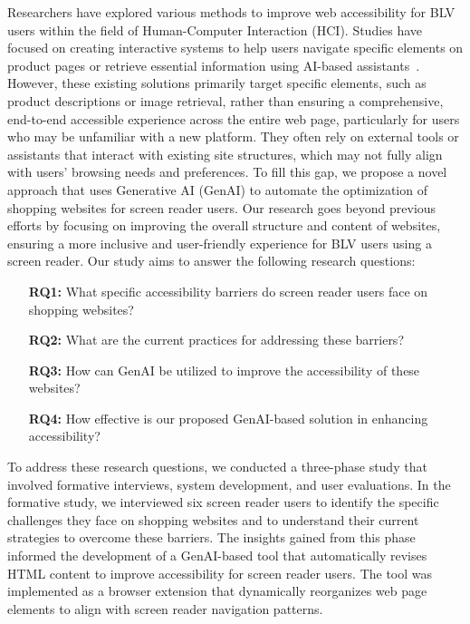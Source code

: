 Researchers have explored various methods to improve web accessibility for BLV users within the field of Human-Computer Interaction (HCI). Studies have focused on creating interactive systems to help users navigate specific elements on product pages or retrieve essential information using AI-based assistants~\cite{10.1145/3411764.3445547, 10.1145/3234695.3236337}. However, these existing solutions primarily target specific elements, such as product descriptions or image retrieval, rather than ensuring a comprehensive, end-to-end accessible experience across the entire web page, particularly for users who may be unfamiliar with a new platform. They often rely on external tools or assistants that interact with existing site structures, which may not fully align with users' browsing needs and preferences. To fill this gap, we propose a novel approach that uses Generative AI (GenAI) to automate the optimization of shopping websites for screen reader users. Our research goes beyond previous efforts by focusing on improving the overall structure and content of websites, ensuring a more inclusive and user-friendly experience for BLV users using a screen reader. Our study aims to answer the following research questions:
\begin{enumerate}
    \item[\textbf{RQ1:}] What specific accessibility barriers do screen reader users face on shopping websites?
    \item[\textbf{RQ2:}] What are the current practices for addressing these barriers?
    \item[\textbf{RQ3:}] How can GenAI be utilized to improve the accessibility of these websites?
    \item[\textbf{RQ4:}] How effective is our proposed GenAI-based solution in enhancing accessibility?
\end{enumerate}

To address these research questions, we conducted a three-phase study that involved formative interviews, system development, and user evaluations. In the formative study, we interviewed six screen reader users to identify the specific challenges they face on shopping websites and to understand their current strategies to overcome these barriers. The insights gained from this phase informed the development of a GenAI-based tool that automatically revises HTML content to improve accessibility for screen reader users. The tool was implemented as a browser extension that dynamically reorganizes web page elements to align with screen reader navigation patterns.

